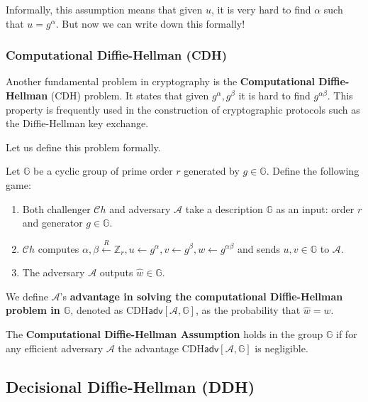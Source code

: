 \documentclass[../lecture-notes.tex]{subfiles}
\begin{document}
Informally, this assumption means that given $u$, it is very hard to find $\alpha$ such that $u = g^{\alpha}$. But now we can write down this formally!

\subsubsection{Computational Diffie-Hellman (CDH)}

Another fundamental problem in cryptography is the \textbf{Computational Diffie-Hellman} (CDH) problem. It states that given $g^{\alpha},g^{\beta}$ it is hard to find $g^{\alpha\beta}$. This property is frequently used in the construction of cryptographic protocols such as the Diffie-Hellman key exchange.

Let us define this problem formally.

\begin{definition}
    Let $\mathbb{G}$ be a cyclic group of prime order $r$ generated by $g \in \mathbb{G}$. Define the following game:
    \begin{enumerate}
        \item Both challenger $\mathcal{C}h$ and adversary $\mathcal{A}$ take a description $\mathbb{G}$ as an input: order $r$ and generator $g \in \mathbb{G}$.
        \item $\mathcal{C}h$ computes $\alpha, \beta \xleftarrow{R} \mathbb{Z}_r, u \gets g^{\alpha}, v \gets g^{\beta}, w \gets g^{\alpha\beta}$ and sends $u,v \in \mathbb{G}$ to $\mathcal{A}$.
        \item The adversary $\mathcal{A}$ outputs $\hat{w} \in \mathbb{G}$.
    \end{enumerate}

    We define $\mathcal{A}$'s \textbf{advantage in solving the computational Diffie-Hellman problem in $\mathbb{G}$}, denoted as $\text{CDH}\mathsf{adv}[\mathcal{A},\mathbb{G}]$, as the probability that $\hat{w} = w$.
\end{definition}

\begin{definition}
    The \textbf{Computational Diffie-Hellman Assumption} holds in the group $\mathbb{G}$ if for any efficient adversary $\mathcal{A}$ the advantage $\text{CDH}\mathsf{adv}[\mathcal{A},\mathbb{G}]$ is negligible.
\end{definition}

\subsection{Decisional Diffie-Hellman (DDH)}
\end{document}
